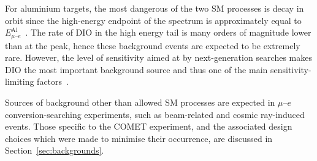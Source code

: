 For aluminium targets, the most dangerous of the two SM processes is decay in
orbit since the high-energy endpoint of the spectrum is approximately equal to
$E^\mathrm{Al}_{\mu\text{--}e}$~\cite{czarnecki}. The rate of DIO in the high energy
tail is many orders of magnitude lower than at the peak, hence these background
events are expected to be extremely rare. However, the level of sensitivity
aimed at by next-generation searches makes DIO the most important background
source and thus one of the main sensitivity-limiting
factors~\cite{the_comet_collaboration_comet_2020}.

Sources of background other than allowed SM processes are expected in
$\mu$--$e$ conversion-searching experiments, such as beam-related and cosmic ray-induced
events. Those specific to the COMET experiment, and the associated design
choices which were made to minimise their occurrence, are discussed in
Section~\ref{sec:backgrounds}.
















